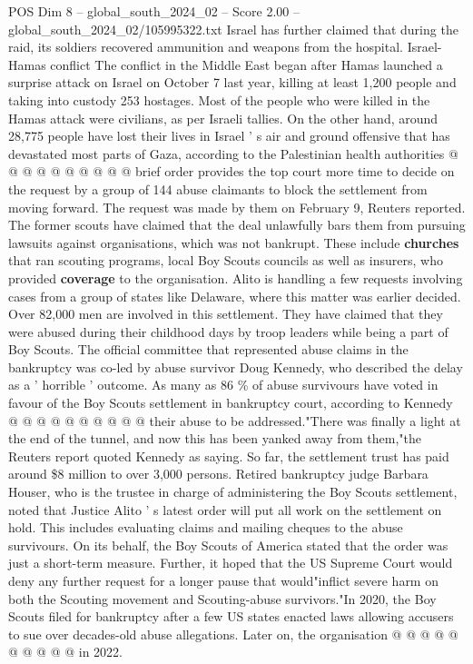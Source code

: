 \begin{textsample}{POS Dim 8 – global\_south\_2024\_02 – Score 2.00 – global\_south\_2024\_02/105995322.txt}
Israel has further claimed that during the raid, its soldiers recovered ammunition and weapons from the hospital.
Israel-Hamas conflict The conflict in the Middle East began after Hamas launched a surprise attack on Israel on October 7 last year, killing at least 1,200 people and taking into custody 253 hostages.
Most of the people who were killed in the Hamas attack were civilians, as per Israeli tallies.
On the other hand, around 28,775 people have lost their lives in Israel ' s air and ground offensive that has devastated most parts of Gaza, according to the Palestinian health authorities @ @ @ @ @ @ @ @ @ @ brief order provides the top court more time to decide on the request by a group of 144 abuse claimants to block the settlement from moving forward.
The request was made by them on February 9, Reuters reported.
The former scouts have claimed that the deal unlawfully bars them from pursuing lawsuits against organisations, which was not bankrupt.
These include \textbf{churches} that ran scouting programs, local Boy Scouts councils as well as insurers, who provided \textbf{coverage} to the organisation.
Alito is handling a few requests involving cases from a group of states like Delaware, where this matter was earlier decided.
Over 82,000 men are involved in this settlement.
They have claimed that they were abused during their childhood days by troop leaders while being a part of Boy Scouts.
The official committee that represented abuse claims in the bankruptcy was co-led by abuse survivor Doug Kennedy, who described the delay as a ' horrible ' outcome.
As many as 86 \% of abuse survivours have voted in favour of the Boy Scouts settlement in bankruptcy court, according to Kennedy @ @ @ @ @ @ @ @ @ @ their abuse to be addressed."There was finally a light at the end of the tunnel, and now this has been yanked away from them,"the Reuters report quoted Kennedy as saying.
So far, the settlement trust has paid around \$8 million to over 3,000 persons.
Retired bankruptcy judge Barbara Houser, who is the trustee in charge of administering the Boy Scouts settlement, noted that Justice Alito ' s latest order will put all work on the settlement on hold.
This includes evaluating claims and mailing cheques to the abuse survivours.
On its behalf, the Boy Scouts of America stated that the order was just a short-term measure.
Further, it hoped that the US Supreme Court would deny any further request for a longer pause that would"inflict severe harm on both the Scouting movement and Scouting-abuse survivors."In 2020, the Boy Scouts filed for bankruptcy after a few US states enacted laws allowing accusers to sue over decades-old abuse allegations.
Later on, the organisation @ @ @ @ @ @ @ @ @ @ in 2022.

\end{textsample}
